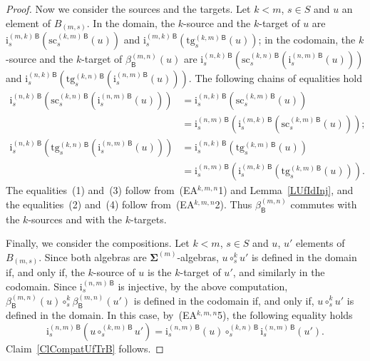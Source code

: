 \documentclass[a4paper, reqno]{amsbook}
\newcommand{\sig}[1]{\mathbf{#1}}             %
\newcommand{\calg}[1]{\boldsymbol{\mathsf{#1}}} %
\newcommand{\src}{\mathrm{sc}}
\newcommand{\tgt}{\mathrm{tg}}
\theoremstyle{plain}
\theoremstyle{definition}
\begin{document}
\begin{proof}
Now we consider the sources and the targets.
Let $k<m$, $s\in S$ and $u$ an element of $B_{(m,s)}$.
In the domain, the $k$-source and the $k$-target of $u$ are $\mathrm{i}^{(m,k)\,\calg{B}}_{s}(\src^{(k,m)\,\calg{B}}_{s}(u))$ and $\mathrm{i}^{(m,k)\,\calg{B}}_{s}(\tgt^{(k,m)\,\calg{B}}_{s}(u))$; in the codomain, the $k$-source and the $k$-target of $\beta^{(m,n)}_{\calg{B}}(u)$ are $\mathrm{i}^{(n,k)\,\calg{B}}_{s}(\src^{(k,n)\,\calg{B}}_{s}(\mathrm{i}^{(n,m)\,\calg{B}}_{s}(u)))$ and $\mathrm{i}^{(n,k)\,\calg{B}}_{s}(\tgt^{(k,n)\,\calg{B}}_{s}(\mathrm{i}^{(n,m)\,\calg{B}}_{s}(u)))$.
The following chains of equalities hold
\begin{align*}
\mathrm{i}^{(n,k)\,\calg{B}}_{s}\left(\src^{(k,n)\,\calg{B}}_{s}\left(\mathrm{i}^{(n,m)\,\calg{B}}_{s}(u)\right)\right)
&=
\mathrm{i}^{(n,k)\,\calg{B}}_{s}\left(\src^{(k,m)\,\calg{B}}_{s}(u)\right)
\tag{1}
\\&=
\mathrm{i}^{(n,m)\,\calg{B}}_{s}\left(\mathrm{i}^{(m,k)\,\calg{B}}_{s}\left(\src^{(k,m)\,\calg{B}}_{s}(u)\right)\right);
\tag{2}
\\
\mathrm{i}^{(n,k)\,\calg{B}}_{s}\left(\tgt^{(k,n)\,\calg{B}}_{s}\left(\mathrm{i}^{(n,m)\,\calg{B}}_{s}(u)\right)\right)
&=
\mathrm{i}^{(n,k)\,\calg{B}}_{s}\left(\tgt^{(k,m)\,\calg{B}}_{s}(u)\right)
\tag{3}
\\&=
\mathrm{i}^{(n,m)\,\calg{B}}_{s}\left(\mathrm{i}^{(m,k)\,\calg{B}}_{s}\left(\tgt^{(k,m)\,\calg{B}}_{s}(u)\right)\right).
\tag{4}
\end{align*}
The equalities~(1) and~(3) follow from~(EA$^{k,m,n}$1) and Lemma~\ref{LUfIdInj}, and the equalities~(2) and~(4) follow from~(EA$^{k,m,n}$2).
Thus $\beta^{(m,n)}_{\calg{B}}$ commutes with the $k$-sources and with the $k$-targets.

Finally, we consider the compositions.
Let $k<m$, $s\in S$ and $u$, $u'$ elements of $B_{(m,s)}$.
Since both algebras are $\sig{\Sigma}^{(m)}$-algebras, $u\circ^{k}_{s}u'$ is defined in the domain if, and only if, the $k$-source of $u$ is the $k$-target of $u'$, and similarly in the codomain.
Since $\mathrm{i}^{(n,m)\,\calg{B}}_{s}$ is injective, by the above computation, $\beta^{(m,n)}_{\calg{B}}(u)\circ^{k}_{s}\beta^{(m,n)}_{\calg{B}}(u')$ is defined in the codomain if, and only if, $u\circ^{k}_{s}u'$ is defined in the domain.
In this case, by~(EA$^{k,m,n}$5), the following equality holds
$$
\mathrm{i}^{(n,m)\,\calg{B}}_{s}\left(u\circ^{(k,m)\,\calg{B}}_{s}u'\right)=\mathrm{i}^{(n,m)\,\calg{B}}_{s}(u)\circ^{(k,n)\,\calg{B}}_{s}\mathrm{i}^{(n,m)\,\calg{B}}_{s}(u').
$$
Claim~\ref{ClCompatUfTrB} follows.


\end{proof}
\end{document}
